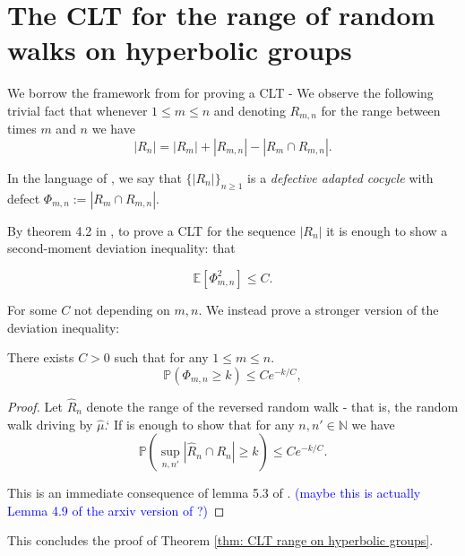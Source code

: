 \section{The CLT for the range of random walks on hyperbolic groups}

We borrow the framework from \cite{MathieuSisto2020} for proving a CLT - We observe the following trivial fact that whenever $ 1 \leq m \leq n $ and denoting $ R _{m,n} $ for the range between times $ m $ and $ n $ we have 
\[ |R _{n}| = |R _{m}| + |R _{m,n}| - |R _{m} \cap R _{m,n}|  .\]

In the language of \cite{MathieuSisto2020}, we say that $ \{ |R _{n}| \} _{n\geq 1} $ is a \emph{defective adapted cocycle} with defect $ \Phi _{m,n} := |R _{m} \cap R _{m,n}| $.

By theorem 4.2 in \cite{MathieuSisto2020}, to prove a CLT for the sequence $ |R _{n}| $ it is enough to show a second-moment deviation inequality: that 

\[ \mathbb{E} [\Phi _{m,n} ^{2} ] \leq C .\] 

For some $ C $ not depending on $ m,n $. We instead prove a stronger version of the deviation inequality:

\begin{prop}  There exists $ C>0 $ such that for any $ 1 \leq m \leq n $.
	\[ \mathbb{P}(\Phi _{m,n} \geq k) \leq Ce ^{-k/C} ,\]
\end{prop}
\begin{proof}
	Let $ \hat{R} _{n} $ denote the range of the reversed random walk - that is, the random walk driving by $ \hat{\mu} $.` If is enough to show that for any $ n, n' \in \mathbb{N} $ we have 
	\[ \mathbb{P}(\sup _{n, n'} |\hat{R} _{n} \cap R _{n} | \geq k) \leq Ce ^{-k/C} .\]
	
	This is an immediate consequence of lemma 5.3 of \cite{Choi2023deviation}. \textcolor{blue}{(maybe this is actually Lemma 4.9 of the arxiv version of \cite{Choi2023deviation}?)}
\end{proof}

This concludes the proof of Theorem \ref{thm: CLT range on hyperbolic groups}.



